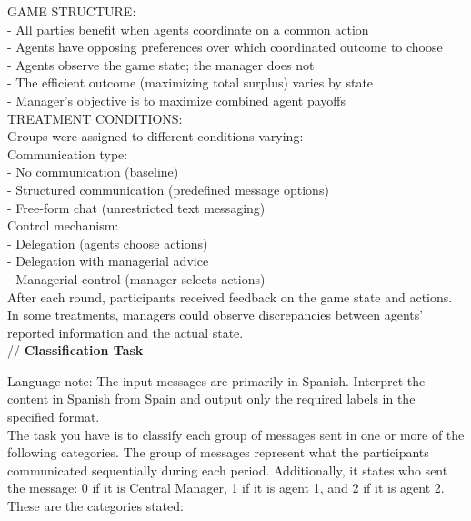 \documentclass[11pt]{article}
\begin{document}
\begin{sloppypar}
\begin{appendices}
\begin{tcolorbox}
GAME STRUCTURE:\\
- All parties benefit when agents coordinate on a common action\\
- Agents have opposing preferences over which coordinated outcome to choose\\
- Agents observe the game state; the manager does not\\
- The efficient outcome (maximizing total surplus) varies by state\\
- Manager's objective is to maximize combined agent payoffs\\

TREATMENT CONDITIONS:\\
Groups were assigned to different conditions varying:\\

Communication type:\\
- No communication (baseline)\\
- Structured communication (predefined message options)\\
- Free-form chat (unrestricted text messaging)\\

Control mechanism:\\
- Delegation (agents choose actions)\\
- Delegation with managerial advice\\
- Managerial control (manager selects actions)\\

After each round, participants received feedback on the game state and actions. In some treatments, managers could observe discrepancies between agents' reported information and the actual state.\\


// \textbf{Classification Task}

Language note: The input messages are primarily in Spanish. Interpret the content in Spanish from Spain and output only the required labels in the specified format.\\

The task you have is to classify each group of messages sent in one or more of the following categories. The group of messages represent what the participants communicated sequentially during each period. Additionally, it states who sent the message: 0 if it is Central Manager, 1 if it is agent 1, and 2 if it is agent 2. \\

These are the categories stated:\\


\end{tcolorbox}
\end{appendices}
\end{sloppypar}
\end{document}
